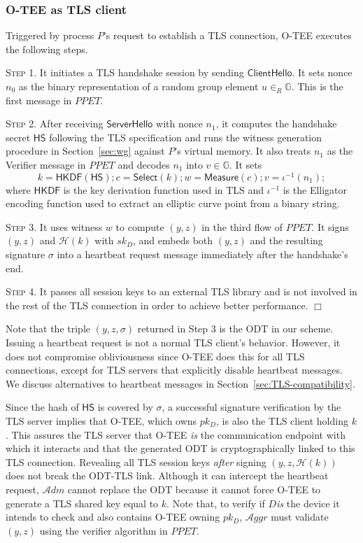 \documentclass[letterpaper,twocolumn,10pt]{article}
\newcommand{\T}{\ensuremath{\mathcal{A}ggr}\xspace}
\newcommand{\ADM}{\ensuremath{\mathcal{A}dm}\xspace}
\newcommand{\dn}{\ensuremath{D}\xspace}
\newcommand{\GG}{\mathbb{G}}
\begin{document}
\subsubsection{O-TEE as TLS client}
\label{sec:client}
%
Triggered by process $P$'s request to establish a TLS connection, O-TEE executes the following steps.

\noindent\textsc{Step 1.}
It initiates a TLS handshake session by sending $\mathsf{ClientHello}$. It sets nonce
$n_0$ as the binary representation of a random group element $u\in_R\GG$. This is the first message in $\mathit{PPET}$.

\vspace{.5em}
\noindent\textsc{Step 2.}
After receiving $\mathsf{ServerHello}$ with nonce $n_1$, it computes the handshake secret
$\mathsf{HS}$ following the TLS specification and runs the witness generation procedure in Section~\ref{sec:wg} against
$P$'s virtual memory. It also treats $n_1$ as the Verifier message in $\mathit{PPET}$ and decodes $n_1$ into $v\in \GG$. It sets
\[
k\!=\!\mathsf{HKDF}(\mathsf{HS});
c\!=\!\mathsf{Select}(k);
w\!=\!\mathsf{Measure}(c);
v\!=\!\iota^{-1}(n_1\!);
\]
where $\mathsf{HKDF}$ is the key derivation function used in TLS and $\iota^{-1}$ is the Elligator encoding function used to
extract an elliptic curve point from a binary string.

\vspace{.5em}
\noindent\textsc{Step 3.}
It uses witness $w$ to compute $(y,z)$ in the third flow of $\mathit{PPET}$. It signs $(y,z)$
and $\mathcal{H}(k)$ with $sk_D$, and embeds both $(y,z)$ and the resulting signature $\sigma$ into a heartbeat
request message immediately after the handshake's end.

\vspace{.5em}
\noindent\textsc{Step 4.}
It passes all session keys to an external TLS library and is not involved in the rest of the
TLS connection in order to achieve better performance. $\Box$

Note that the triple $(y,z,\sigma)$ returned in Step 3 is the ODT in our scheme. Issuing a heartbeat request is
not a normal TLS client's behavior. However, it does not compromise obliviousness since O-TEE does this for all
TLS connections, except for TLS servers that explicitly disable heartbeat messages. We discuss alternatives
to heartbeat messages in Section~\ref{sec:TLS-compatibility}.

Since the hash of $\mathsf{HS}$ is covered by $\sigma$, a successful signature verification by the TLS
server implies that O-TEE, which owns $pk_D$, is also the TLS client holding $k$. This assures the TLS server
that O-TEE \emph{is} the communication endpoint with which it interacts and that the generated ODT is cryptographically
linked to this TLS connection. Revealing all TLS session keys \emph{after} signing $(y,z, \mathcal{H}(k))$ does
not break the ODT-TLS link. Although it can intercept the heartbeat request, \ADM cannot replace the ODT
because it cannot force O-TEE to generate a TLS shared key equal to $k$. Note that, to verify if \dn \emph{is} the device it
intends to check and also contains O-TEE owning $pk_D$, \T must validate $(y,z)$ using the verifier algorithm in $\mathit{PPET}$.
\end{document}
